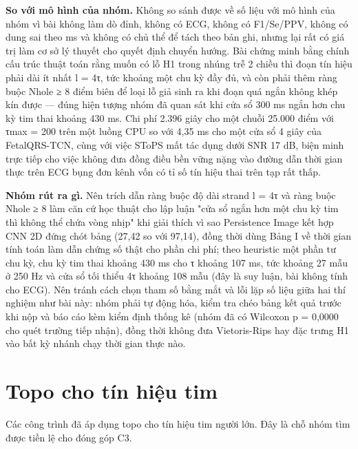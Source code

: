 \documentclass[12pt,a4paper]{article}
\begin{document}
\noindent \textbf{\color{tdtblue}So với mô hình của nhóm.} Không so sánh được về số liệu với mô hình của nhóm vì bài không làm dò đỉnh, không có ECG, không có F1/Se/PPV, không có dung sai theo ms và không có chủ thể để tách theo bản ghi, nhưng lại rất có giá trị làm cơ sở lý thuyết cho quyết định chuyển hướng. Bài chứng minh bằng chính cấu trúc thuật toán rằng muốn có lỗ H1 trong nhúng trễ 2 chiều thì đoạn tín hiệu phải dài ít nhất l = 4τ, tức khoảng một chu kỳ đầy đủ, và còn phải thêm ràng buộc Nhole ≥ 8 điểm biên để loại lỗ giả sinh ra khi đoạn quá ngắn không khép kín được — đúng hiện tượng nhóm đã quan sát khi cửa sổ 300 ms ngắn hơn chu kỳ tim thai khoảng 430 ms. Chi phí 2.396 giây cho một chuỗi 25.000 điểm với τmax = 200 trên một luồng CPU so với 4,35 ms cho một cửa sổ 4 giây của FetalQRS-TCN, cùng với việc SToPS mất tác dụng dưới SNR 17 dB, biện minh trực tiếp cho việc không đưa đồng điều bền vững nặng vào đường dẫn thời gian thực trên ECG bụng đơn kênh vốn có tỉ số tín hiệu thai trên tạp rất thấp.\par\vspace{3pt}
\noindent \textbf{\color{tdtblue}Nhóm rút ra gì.} Nên trích dẫn ràng buộc độ dài strand l = 4τ và ràng buộc Nhole ≥ 8 làm căn cứ học thuật cho lập luận "cửa sổ ngắn hơn một chu kỳ tim thì không thể chứa vòng nhịp" khi giải thích vì sao Persistence Image kết hợp CNN 2D đứng chót bảng (27,42 so với 97,14), đồng thời dùng Bảng I về thời gian tính toán làm dẫn chứng số thật cho phần chi phí; theo heuristic một phần tư chu kỳ, chu kỳ tim thai khoảng 430 ms cho τ khoảng 107 ms, tức khoảng 27 mẫu ở 250 Hz và cửa sổ tối thiểu 4τ khoảng 108 mẫu (đây là suy luận, bài không tính cho ECG). Nên tránh cách chọn tham số bằng mắt và lỗi lặp số liệu giữa hai thí nghiệm như bài này: nhóm phải tự động hóa, kiểm tra chéo bảng kết quả trước khi nộp và báo cáo kèm kiểm định thống kê (nhóm đã có Wilcoxon p = 0,0000 cho quét trường tiếp nhận), đồng thời không đưa Vietoris-Rips hay đặc trưng H1 vào bất kỳ nhánh chạy thời gian thực nào.\par\vspace{3pt}
\vspace{6pt}
\clearpage
\section{Topo cho tín hiệu tim}
Các công trình đã áp dụng topo cho tín hiệu tim người lớn. Đây là chỗ nhóm tìm được tiền lệ cho đóng góp C3.
\end{document}
